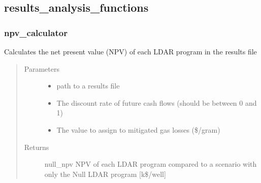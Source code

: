 \documentclass[letterpaper,10pt,english]{sphinxmanual}
\begin{document}
\subsection{results\_analysis\_functions}
\label{\detokenize{index:module-feast.ResultsProcessing.results_analysis_functions}}\label{\detokenize{index:results-analysis-functions}}

\subsubsection{npv\_calculator}
\label{\detokenize{index:npv-calculator}}

\begin{fulllineitems}
\label{\detokenize{index:feast.ResultsProcessing.results_analysis_functions.npv_calculator}}
Calculates the net present value (NPV) of each LDAR program in the results file
\begin{quote}\begin{description}
\item[{Parameters}] \leavevmode\begin{itemize}
\item {} 
 \textendash{} path to a results file

\item {} 
 \textendash{} The discount rate of future cash flows (should be between 0 and 1)

\item {} 
 \textendash{} The value to assign to mitigated gas losses (\$/gram)

\end{itemize}

\item[{Returns}] \leavevmode
null\_npv          NPV of each LDAR program compared to a scenario with only the Null LDAR program {[}k\$/well{]}

\end{description}\end{quote}

\end{fulllineitems}
\end{document}
